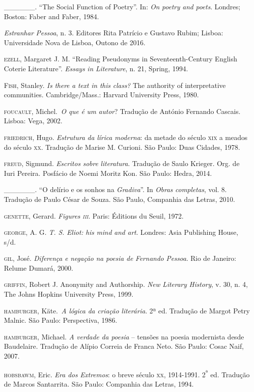 \begin{Parskip}
\_\_\_\_\_\_. ``The Social Function of Poetry''. In: \emph{On poetry and
poets}. Londres; Boston: Faber and Faber, 1984.

\emph{Estranhar Pessoa}, n. 3. Editores Rita Patrício e Gustavo Rubim;
Lisboa: Universidade Nova de Lisboa, Outono de 2016.

\textsc{ezell}, Margaret J. M. ``Reading Pseudonyms in
Seventeenth-Century English Coterie Literature''. \emph{Essays in
Literature}, n. 21, Spring, 1994.

\textsc{Fish}, Stanley. \emph{Is there a text in this class?} The
authority of interpretative communities. Cambridge/Mass.: Harvard
University Press, 1980.

\textsc{foucault}, Michel.~\emph{O que é um autor}? Tradução de António
Fernando Cascais. Lisboa: Vega, 2002.

\textsc{friedrich}, Hugo. \emph{Estrutura da lírica moderna}: da metade
do século \textsc{xix} a meados do século \textsc{xx}. Tradução de
Marise M. Curioni. São Paulo: Duas Cidades, 1978.

\textsc{freud}, Sigmund. \emph{Escritos sobre literatura}. Tradução de
Saulo Krieger. Org. de Iuri Pereira. Posfácio de Noemi Moritz Kon. São
Paulo: Hedra, 2014.

\_\_\_\_\_\_. ``O delírio e os sonhos na \emph{Gradiva}''. In
\emph{Obras completas}, vol. 8. Tradução de Paulo César de Souza. São
Paulo, Companhia das Letras, 2010.

\textsc{genette}, Gerard. \emph{Figures \textsc{iii}}. Paris: Éditions
du Seuil, 1972.

\textsc{george}, A. G. \emph{T. S. Eliot: his mind and art}. Londres:
Asia Publishing House, s/d.

\textsc{gil}, José. \emph{Diferença e negação na poesia de Fernando
Pessoa}. Rio de Janeiro: Relume Dumará, 2000.

\textsc{griffin}, Robert J. Anonymity and Authorship. \emph{New Literary
History}, v. 30, n. 4, The Johns Hopkins University Press, 1999.

\textsc{hamburger}, Käte.~\emph{A lógica da criação literária}. 2ª ed.
Tradução de Margot Petry Malnic. São Paulo: Perspectiva, 1986.

\textsc{hamburger}, Michael. \emph{A verdade da poesia} -- tensões na
poesia modernista desde Baudelaire. Tradução de Alípio Correia de Franca
Neto. São Paulo: Cosac Naif, 2007.

\textsc{hobsbawm}, Eric. \emph{Era dos Extremos}: o breve século
\textsc{xx}, 1914-1991. 2\textsuperscript{ª} ed. Tradução de Marcos
Santarrita. São Paulo: Companhia das Letras, 1994.


\end{Parskip}
